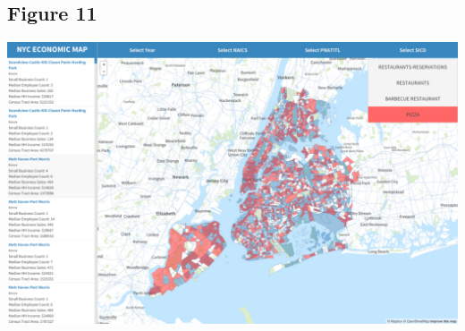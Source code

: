 \documentclass[article, 11pt]{article} %
\begin{document}
\subsection*{Figure 11}
\includegraphics[width=1.0\textwidth]{11}

\end{document}

